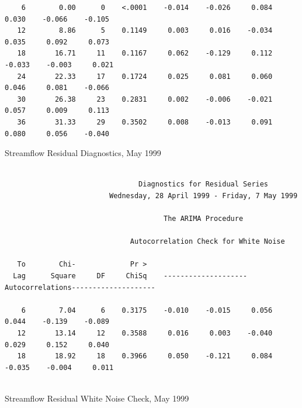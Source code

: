 \documentclass[12pt]{report}
\begin{document}
\begin{table}
\begin{centering}
\begin{verbatim}
    6        0.00      0    <.0001    -0.014    -0.026     0.084     0.030    -0.066    -0.105
   12        8.86      5    0.1149     0.003     0.016    -0.034     0.035     0.092     0.073
   18       16.71     11    0.1167     0.062    -0.129     0.112    -0.033    -0.003     0.021
   24       22.33     17    0.1724     0.025     0.081     0.060     0.046     0.081    -0.066
   30       26.38     23    0.2831     0.002    -0.006    -0.021     0.057     0.009     0.113
   36       31.33     29    0.3502     0.008    -0.013     0.091     0.080     0.056    -0.040

\end{verbatim}
\end{centering}\normalsize\caption{Streamflow Residual Diagnostics, May 1999}
\end{table}
\begin{table} \scriptsize
\begin{centering}
\begin{verbatim}

                                Diagnostics for Residual Series
                         Wednesday, 28 April 1999 - Friday, 7 May 1999

                                      The ARIMA Procedure

                              Autocorrelation Check for White Noise

   To        Chi-             Pr >
  Lag      Square     DF     ChiSq    --------------------Autocorrelations--------------------

    6        7.04      6    0.3175    -0.010    -0.015     0.056     0.044    -0.139    -0.089
   12       13.14     12    0.3588     0.016     0.003    -0.040     0.029     0.152     0.040
   18       18.92     18    0.3966     0.050    -0.121     0.084    -0.035    -0.004     0.011


\end{verbatim}
\end{centering}\normalsize\caption{Streamflow Residual White Noise Check, May 1999}
\end{table}
\end{document}
